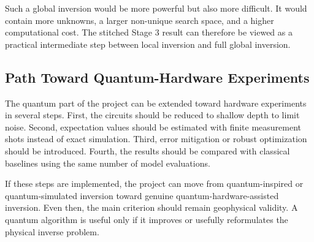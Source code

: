 \documentclass[12pt,a4paper]{article}
\begin{document}
Such a global inversion would be more powerful but also more difficult. It would contain more unknowns, a larger non-unique search space, and a higher computational cost. The stitched Stage 3 result can therefore be viewed as a practical intermediate step between local inversion and full global inversion.

\subsection{Path Toward Quantum-Hardware Experiments}
The quantum part of the project can be extended toward hardware experiments in several steps. First, the circuits should be reduced to shallow depth to limit noise. Second, expectation values should be estimated with finite measurement shots instead of exact simulation. Third, error mitigation or robust optimization should be introduced. Fourth, the results should be compared with classical baselines using the same number of model evaluations.

If these steps are implemented, the project can move from quantum-inspired or quantum-simulated inversion toward genuine quantum-hardware-assisted inversion. Even then, the main criterion should remain geophysical validity. A quantum algorithm is useful only if it improves or usefully reformulates the physical inverse problem.

\clearpage


\end{document}
